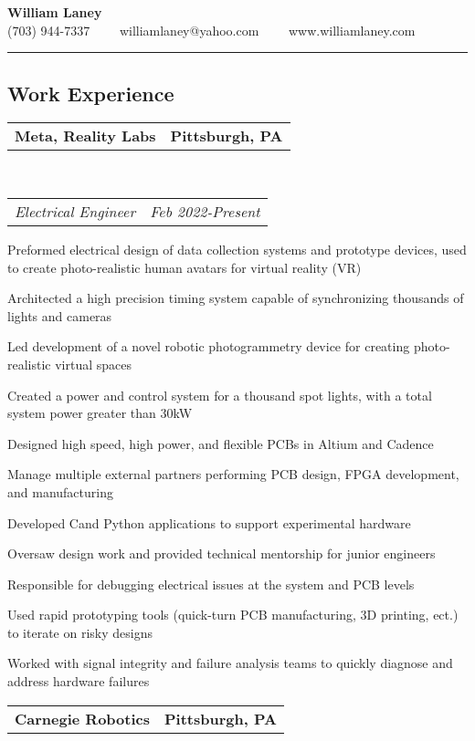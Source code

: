 \documentclass[10pt,letterpaper]{article}
\makeatletter
\newcommand{\headerrow}[2]
{\begin{tabular*}{\linewidth}{l@{\extracolsep{\fill}}r}
	#1 &
	#2 \\
\end{tabular*}}
\newcommand{\CPP}
{C\nolinebreak[4]\hspace{-.05em}\raisebox{.22ex}{\footnotesize\bf ++}}
\makeatother
\begin{document}
\begin{center}
{\LARGE \textbf{William Laney}}\\
\vspace{0.1em}
(703) 944-7337\ \ \textbullet
\ \ williamlaney@yahoo.com\ \ \textbullet
\ \ www.williamlaney.com
\end{center}

\hrule
\vspace{-0.4em}
\subsection*{Work Experience}
\headerrow
		{\textbf{Meta, Reality Labs}}
		{\textbf{Pittsburgh, PA}}
		\\
	\headerrow
		{\emph{Electrical Engineer}}
		{\emph{Feb 2022-Present}}
	\begin{itemize*}
		\item Preformed electrical design of data collection systems and prototype devices, used to create photo-realistic human avatars for virtual reality (VR)
		\item Architected a high precision timing system capable of synchronizing thousands of lights and cameras
		\item Led development of a novel robotic photogrammetry device for creating photo-realistic virtual spaces
		\item Created a power and control system for a thousand spot lights, with a total system power greater than 30kW
		\item Designed high speed, high power, and flexible PCBs in Altium and Cadence
		\item Manage multiple external partners performing PCB design, FPGA development, and manufacturing
		\item Developed \CPP \space  and Python applications to support experimental hardware
		\item Oversaw design work and provided technical mentorship for junior engineers
		\item Responsible for debugging electrical issues at the system and PCB levels
		\item Used rapid prototyping tools (quick-turn PCB manufacturing, 3D printing, ect.) to iterate on risky designs
		\item Worked with signal integrity and failure analysis teams to quickly diagnose and address hardware failures
	\end{itemize*}
	\headerrow
		{\textbf{Carnegie Robotics}}
		{\textbf{Pittsburgh, PA}}
	\\
\end{document}
